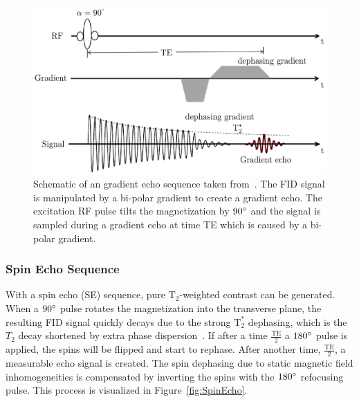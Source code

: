 \begin{figure}[h] %
	\centering
	\includegraphics[width=\linewidth]{./Images/GradientEcho.pdf} 
	\caption{Schematic of an gradient echo sequence taken from~\cite{PulseSequences}. The FID signal is manipulated by a bi-polar gradient to create a gradient echo. The excitation RF pulse tilts the magnetization by $90 \degree$ and the signal is sampled during a gradient echo at time TE which is caused by a bi-polar gradient.}
	\label{fig:GradientEcho}
\end{figure}

\subsubsection{Spin Echo Sequence}
With a spin echo (SE) sequence, pure $\text{T}_2$-weighted contrast can be generated. When a $90\degree$ pulse rotates the magnetization into the transverse plane, the resulting FID signal quickly decays due to the strong $\text{T}^*_2$ dephasing, which is the $T_2$ decay shortened by extra phase dispersion~\cite{Serai2021}. If after a time $\frac{\text{TE}}{2}$ a $180\degree$ pulse is applied, the spins will be flipped and start to rephase. After another time, $\frac{\text{TE}}{2}$, a measurable echo signal is created. The spin dephasing due to static magnetic field inhomogeneities is compensated by inverting the spins with the $180\degree$ refocusing pulse. This process is visualized in Figure~\ref{fig:SpinEcho}.

